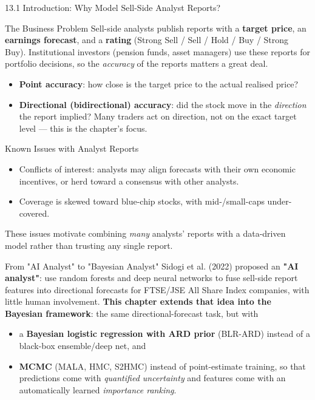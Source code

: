 \documentclass[aspectratio=169,10pt]{beamer}
\begin{document}
\begin{frame}[allowframebreaks]{13.1 \; Introduction: Why Model Sell-Side Analyst Reports?}

\begin{block}{The Business Problem}
Sell-side analysts publish reports with a \textbf{target price}, an
\textbf{earnings forecast}, and a \textbf{rating} (Strong Sell / Sell / Hold
/ Buy / Strong Buy). Institutional investors (pension funds, asset managers)
use these reports for portfolio decisions, so the \emph{accuracy} of the
reports matters a great deal.
\begin{itemize}
  \item \textbf{Point accuracy}: how close is the target price to the actual
        realised price?
  \item \textbf{Directional (bidirectional) accuracy}: did the stock move in
        the \emph{direction} the report implied? Many traders act on
        direction, not on the exact target level --- this is the chapter's
        focus.
\end{itemize}
\end{block}

\begin{alertblock}{Known Issues with Analyst Reports}
\begin{itemize}
  \item Conflicts of interest: analysts may align forecasts with their own
        economic incentives, or herd toward a consensus with other analysts.
  \item Coverage is skewed toward blue-chip stocks, with mid-/small-caps
        under-covered.
  \end{itemize}
These issues motivate combining \emph{many} analysts' reports with a
data-driven model rather than trusting any single report.
\end{alertblock}

\framebreak

\begin{block}{From "AI Analyst" to "Bayesian Analyst"}
Sidogi et al. (2022) proposed an \textbf{"AI analyst"}: use random forests
and deep neural networks to fuse sell-side report features into directional
forecasts for FTSE/JSE All Share Index companies, with little human
involvement. \textbf{This chapter extends that idea into the Bayesian
framework}: the same directional-forecast task, but with
\begin{itemize}
  \item a \textbf{Bayesian logistic regression with ARD prior} (BLR-ARD)
        instead of a black-box ensemble/deep net, and
  \item \textbf{MCMC} (MALA, HMC, S2HMC) instead of point-estimate training,
        so that predictions come with \emph{quantified uncertainty} and
        features come with an automatically learned \emph{importance
        ranking}.
\end{itemize}
\end{block}


\end{frame}
\end{document}

